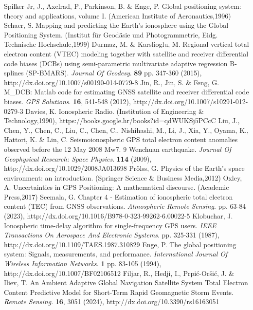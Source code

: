 \let\LaTeXcline\cline\documentclass[sn-mathphys-num]{sn-jnl}\let\cline\LaTeXcline
\begin{document}
\begin{thebibliography}{00}
Spilker Jr, J., Axelrad, P., Parkinson, B. \& Enge, P. Global positioning system: theory and applications, volume I. (American Institute of Aeronautics,1996)
Schaer, S. Mapping and predicting the Earth's ionosphere using the Global Positioning System. (Institut für Geodäsie und Photogrammetrie, Eidg. Technische Hochschule,1999)
Durmaz, M. \& Karslioglu, M. Regional vertical total electron content (VTEC) modeling together with satellite and receiver differential code biases (DCBs) using semi-parametric multivariate adaptive regression B-splines (SP-BMARS). {\em Journal Of Geodesy}. \textbf{89} pp. 347-360 (2015), http://dx.doi.org/10.1007/s00190-014-0779-8
Jin, R., Jin, S. \& Feng, G. M_DCB: Matlab code for estimating GNSS satellite and receiver differential code biases. {\em GPS Solutions}. \textbf{16}, 541-548 (2012), http://dx.doi.org/10.1007/s10291-012-0279-3
Davies, K. Ionospheric Radio. (Institution of Engineering & Technology,1990), https://books.google.hr/books?id=qdWUKSj5PCcC
Liu, J., Chen, Y., Chen, C., Liu, C., Chen, C., Nishihashi, M., Li, J., Xia, Y., Oyama, K., Hattori, K. \& Lin, C. Seismoionospheric GPS total electron content anomalies observed before the 12 May 2008 Mw7. 9 Wenchuan earthquake. {\em Journal Of Geophysical Research: Space Physics}. \textbf{114} (2009), http://dx.doi.org/10.1029/2008JA013698
Prölss, G. Physics of the Earth’s space environment: an introduction. (Springer Science & Business Media,2012)
Oxley, A. Uncertainties in GPS Positioning: A mathematical discourse. (Academic Press,2017)
Seemala, G. Chapter 4 - Estimation of ionospheric total electron content (TEC) from GNSS observations. {\em Atmospheric Remote Sensing}. pp. 63-84 (2023), http://dx.doi.org/10.1016/B978-0-323-99262-6.00022-5
Klobuchar, J. Ionospheric time-delay algorithm for single-frequency GPS users. {\em IEEE Transactions On Aerospace And Electronic Systems}. pp. 325-331 (1987), http://dx.doi.org/10.1109/TAES.1987.310829
Enge, P. The global positioning system: Signals, measurements, and performance. {\em International Journal Of Wireless Information Networks}. \textbf{1} pp. 83-105 (1994), http://dx.doi.org/10.1007/BF02106512
Filjar, R., Hedji, I., Prpić-Oršić, J. \& Iliev, T. An Ambient Adaptive Global Navigation Satellite System Total Electron Content Predictive Model for Short-Term Rapid Geomagnetic Storm Events. {\em Remote Sensing}. \textbf{16}, 3051 (2024), http://dx.doi.org/10.3390/rs16163051

\end{thebibliography}
\end{document}
